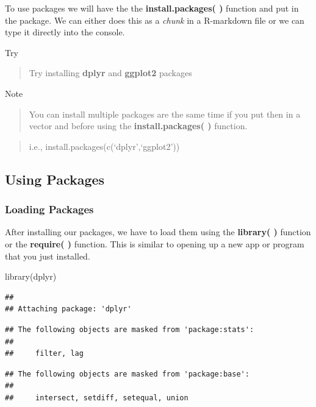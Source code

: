 \documentclass[
]{book}
\newenvironment{Shaded}{\begin{snugshade}}{\end{snugshade}}
\newcommand{\FunctionTok}[1]{\textcolor[rgb]{0.00,0.00,0.00}{#1}}
\newcommand{\NormalTok}[1]{#1}
\begin{document}
To use packages we will have the the \textbf{install.packages( )} function and put in the package. We can either does this as a \emph{chunk} in a R-markdown file or we can type it directly into the console.

Try

\begin{quote}
Try installing \textbf{dplyr} and \textbf{ggplot2} packages
\end{quote}

Note

\begin{quote}
You can install multiple packages are the same time if you put then in a vector and before using the \textbf{install.packages( )} function.
\end{quote}

\begin{quote}
i.e., install.packages(c(`dplyr',`ggplot2'))
\end{quote}

\hypertarget{using-packages}{%
\subsection{Using Packages}\label{using-packages}}

\hypertarget{loading-packages}{%
\subsubsection{Loading Packages}\label{loading-packages}}

After installing our packages, we have to load them using the \textbf{library( )} function or the \textbf{require( )} function. This is similar to opening up a new app or program that you just installed.

\begin{Shaded}
\begin{Highlighting}[]
\FunctionTok{library}\NormalTok{(dplyr)}
\end{Highlighting}
\end{Shaded}

\begin{verbatim}
## 
## Attaching package: 'dplyr'
\end{verbatim}

\begin{verbatim}
## The following objects are masked from 'package:stats':
## 
##     filter, lag
\end{verbatim}

\begin{verbatim}
## The following objects are masked from 'package:base':
## 
##     intersect, setdiff, setequal, union
\end{verbatim}
\end{document}
